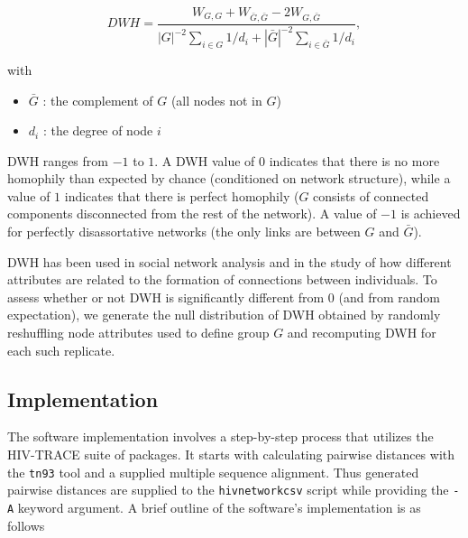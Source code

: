 \documentclass[utf8]{FrontiersinHarvard} %
\newcommand{\TODO}[1]{{\color{red}{#1}}}
\begin{document}
\begin{equation}
	DWH = \frac{W_{G,G}+ W_{\bar G, \bar G} - 2W_{G,\bar G}}{|G|^{-2}\sum_{i\in G} 1 / d_i + |\bar G|^{-2}\sum_{i\in \bar G} 1 / d_i },
\end{equation}

with
\begin{itemize}
	\item{$\bar G$ : the complement of $G$ (all nodes not in $G$)}
	\item{$d_i$ : the degree of node $i$}
\end{itemize}

DWH ranges from $-1$ to $1$. A DWH value of $0$ indicates that there is no more
homophily than expected by chance (conditioned on network structure), while a
value of $1$ indicates that there is perfect homophily ($G$ consists of
connected components disconnected from the rest of the network). A value of
$-1$ is achieved for perfectly disassortative networks (the only links are
between $G$ and $\bar G$).

DWH has been used in social network analysis and in the study of how different
attributes are related to the formation of connections between
individuals\TODO{SAR -- Reference}. To assess whether or not DWH is
significantly different from $0$ (and from random expectation), we generate the
null distribution of DWH obtained by randomly reshuffling node attributes used
to define group $G$ and recomputing DWH for each such replicate.

\subsection{Implementation}

The software implementation involves a step-by-step process that utilizes the
HIV-TRACE suite of packages. It starts with calculating pairwise distances with
the {\tt tn93} tool and a supplied multiple sequence alignment. Thus generated
pairwise distances are supplied to the {\tt hivnetworkcsv} script while
providing the {\tt -A} keyword argument. A brief outline of the software's
implementation is as follows
\end{document}
